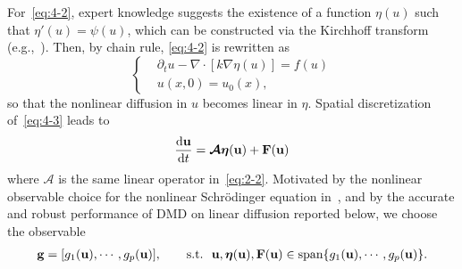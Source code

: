 \documentclass[10pt]{article}
\numberwithin{equation}{section}
\theoremstyle{plain}
\theoremstyle{remark}
\theoremstyle{remark}
\begin{document}

For~\cref{eq:4-2}, expert knowledge suggests the existence of a function $\eta(u)$ such that $\eta'(u) = \psi(u)$, which can be constructed via the Kirchhoff transform (e.g.,~\cite{tartakovsky-2003-stochastic, tartakovsky1999conditional}). Then, by chain rule, \cref{eq:4-2} is rewritten as
\begin{equation}\label{eq:4-3}
\left\{
\begin{aligned}
&\partial_t u -\nabla \cdot [k\nabla \eta(u) ] = f(u)\\
&u(x,0) = u_0(x),
\end{aligned}
\right.
\end{equation}
so that the nonlinear diffusion in $u$ becomes linear in $\eta$. Spatial discretization of~\cref{eq:4-3} leads to
\begin{equation}\label{eq:4-4}
\frac{\text d\bold u}{\text dt} = \boldsymbol{\mathcal A} \boldsymbol \eta(\bold u) +\bold F(\bold u)
\end{equation}
where $\boldsymbol{\mathcal A}$ is the same linear operator in~\cref{eq:2-2}. Motivated by the nonlinear observable choice for the nonlinear Schr\"odinger equation in~\cite{kutzbook}, and by the accurate and robust performance of DMD on linear diffusion reported below, we choose the observable 
\begin{equation}\label{eq:4-5}
\begin{aligned}
\bold g = [g_1(\bold u), \cdots, g_p(\bold u)],  \qquad \mbox{s.t.}  \ \ \bold u, \boldsymbol \eta(\bold u), \bold F(\bold u) \in \text{span}\{g_1(\bold u), \cdots, g_p(\bold u)\}.
\end{aligned}
\end{equation}
\end{document}
